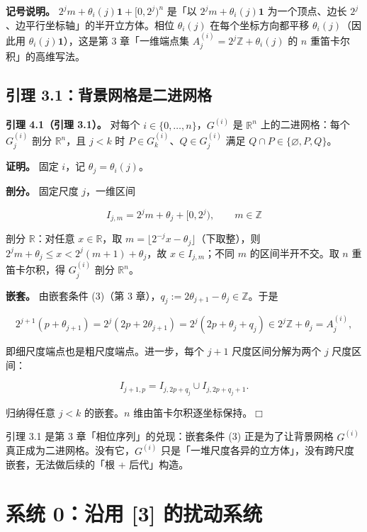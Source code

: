 \documentclass[a4paper,11pt,openany]{ctexbook}
\numberwithin{equation}{chapter}
\numberwithin{figure}{chapter}
\numberwithin{table}{chapter}
\begin{document}
\textbf{记号说明。} $2^j m+\theta_i(j)\mathbf1+[0,2^j)^n$ 是「以 $2^j m+\theta_i(j)\mathbf1$ 为一个顶点、边长 $2^j$、边平行坐标轴」的半开立方体。相位 $\theta_i(j)$ 在每个坐标方向都平移 $\theta_i(j)$（因此用 $\theta_i(j)\mathbf1$），这是第 3 章「一维端点集 $A_j^{(i)}=2^j\mathbb Z+\theta_i(j)$ 的 $n$ 重笛卡尔积」的高维写法。

\subsection{引理 3.1：背景网格是二进网格}

\textbf{引理 4.1（引理 3.1）。} 对每个 $i\in\{0,\dots,n\}$，$G^{(i)}$ 是 $\mathbb R^n$ 上的二进网格：每个 $G_j^{(i)}$ 剖分 $\mathbb R^n$，且 $j<k$ 时 $P\in G_k^{(i)}$、$Q\in G_j^{(i)}$ 满足 $Q\cap P\in\{\varnothing,P,Q\}$。

\textbf{证明。} 固定 $i$，记 $\theta_j=\theta_i(j)$。

\textbf{剖分。} 固定尺度 $j$，一维区间

$$I_{j,m}=2^j m+\theta_j+[0,2^j),\qquad m\in\mathbb Z$$

剖分 $\mathbb R$：对任意 $x\in\mathbb R$，取 $m=\lfloor2^{-j}x-\theta_j\rfloor$（下取整），则 $2^j m+\theta_j\le x<2^j(m+1)+\theta_j$，故 $x\in I_{j,m}$；不同 $m$ 的区间半开不交。取 $n$ 重笛卡尔积，得 $G_j^{(i)}$ 剖分 $\mathbb R^n$。

\textbf{嵌套。} 由嵌套条件 (3)（第 3 章），$q_j:=2\theta_{j+1}-\theta_j\in\mathbb Z$。于是

$$2^{j+1}(p+\theta_{j+1})=2^j(2p+2\theta_{j+1})=2^j(2p+\theta_j+q_j)\in 2^j\mathbb Z+\theta_j=A_j^{(i)},$$

即细尺度端点也是粗尺度端点。进一步，每个 $j+1$ 尺度区间分解为两个 $j$ 尺度区间：

$$I_{j+1,p}=I_{j,2p+q_j}\cup I_{j,2p+q_j+1}.$$

归纳得任意 $j<k$ 的嵌套。$n$ 维由笛卡尔积逐坐标保持。$\Box$

\begin{intuitionbox}
引理 3.1 是第 3 章「相位序列」的兑现：嵌套条件 (3) 正是为了让背景网格 $G^{(i)}$ 真正成为二进网格。没有它，$G^{(i)}$ 只是「一堆尺度各异的立方体」，没有跨尺度嵌套，无法做后续的「根 + 后代」构造。
\end{intuitionbox}

\section{系统 0：沿用 [3] 的扰动系统}
\end{document}
